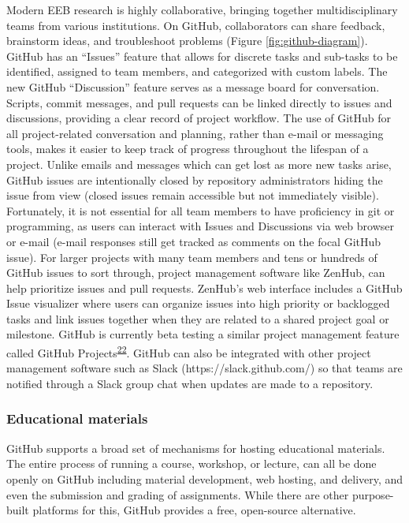Modern EEB research is highly collaborative, bringing together multidisciplinary teams from various institutions.
On GitHub, collaborators can share feedback, brainstorm ideas, and troubleshoot problems (Figure \ref{fig:github-diagram}).
GitHub has an ``Issues'' feature that allows for discrete tasks and sub-tasks to be identified, assigned to team members, and categorized with custom labels.
The new GitHub ``Discussion'' feature serves as a message board for conversation.
Scripts, commit messages, and pull requests can be linked directly to issues and discussions, providing a clear record of project workflow.
The use of GitHub for all project-related conversation and planning, rather than e-mail or messaging tools, makes it easier to keep track of progress throughout the lifespan of a project.
Unlike emails and messages which can get lost as more new tasks arise, GitHub issues are intentionally closed by repository administrators hiding the issue from view (closed issues remain accessible but not immediately visible).
Fortunately, it is not essential for all team members to have proficiency in git or programming, as users can interact with Issues and Discussions via web browser or e-mail (e-mail responses still get tracked as comments on the focal GitHub issue).
For larger projects with many team members and tens or hundreds of GitHub issues to sort through, project management software like ZenHub, can help prioritize issues and pull requests.
ZenHub's web interface includes a GitHub Issue visualizer where users can organize issues into high priority or backlogged tasks and link issues together when they are related to a shared project goal or milestone.
GitHub is currently beta testing a similar project management feature called GitHub Projects\textsuperscript{\protect\hyperlink{ref-RhBKe0MG}{22}}. GitHub can also be integrated with other project management software such as Slack (https://slack.github.com/) so that teams are notified through a Slack group chat when updates are made to a repository.

\hypertarget{educational-materials}{%
\subsubsection{Educational materials}\label{educational-materials}}

GitHub supports a broad set of mechanisms for hosting educational materials.
The entire process of running a course, workshop, or lecture, can all be done openly on GitHub including material development, web hosting, and delivery, and even the submission and grading of assignments.
While there are other purpose-built platforms for this, GitHub provides a free, open-source alternative.

